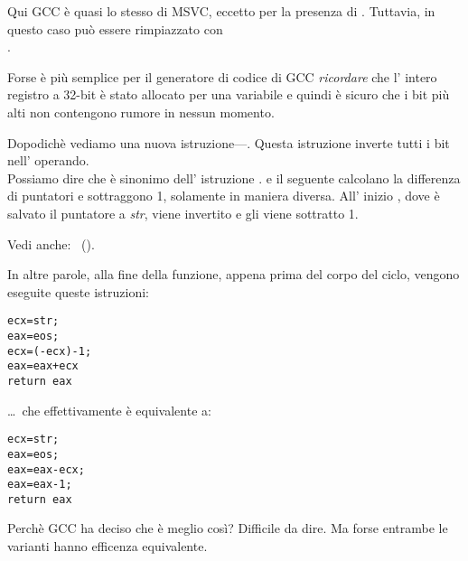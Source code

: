 
 
Qui GCC è quasi lo stesso di MSVC, eccetto per la presenza di \MOVZX.
Tuttavia, in questo caso \MOVZX può essere rimpiazzato con\\
.

Forse è più semplice per il generatore di codice di GCC \emph{ricordare} 
che l' intero registro \EDX a 32-bit 
è stato allocato per una variabile \Tchar e quindi è sicuro che i bit più alti 
non contengono rumore in nessun momento.

\label{strlen_NOT_ADD}

Dopodichè vediamo una nuova istruzione---\NOT. Questa istruzione inverte tutti i bit nell' operando. \\
Possiamo dire che è sinonimo dell' istruzione . 
\NOT e il seguente \ADD calcolano la differenza di puntatori e sottraggono 1, solamente in maniera diversa. 
All' inizio \ECX, dove è salvato il puntatore a \emph{str}, viene invertito e gli viene sottratto 1.

Vedi anche: \q{\SignedNumbersSectionName}~().
 
In altre parole, alla fine della funzione, appena prima del corpo del ciclo, vengono eseguite queste istruzioni:

\begin{lstlisting}[style=customc]
ecx=str;
eax=eos;
ecx=(-ecx)-1; 
eax=eax+ecx
return eax
\end{lstlisting}

\dots~che effettivamente è equivalente a:

\begin{lstlisting}[style=customc]
ecx=str;
eax=eos;
eax=eax-ecx;
eax=eax-1;
return eax
\end{lstlisting}

Perchè GCC ha deciso che è meglio così? Difficile da dire.
Ma forse entrambe le varianti hanno efficenza equivalente.
